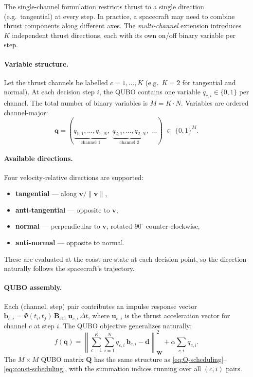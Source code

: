 \documentclass[8pt,a4paper]{article}
\newcommand{\bvec}[1]{\bm{#1}}
\newcommand{\uvec}{\bvec{u}}
\newcommand{\Qmat}{\bvec{Q}}
\theoremstyle{definition}
\theoremstyle{remark}
\begin{document}
The single-channel formulation restricts thrust to a single direction
(e.g.\ tangential) at every step.  In practice, a spacecraft may need
to combine thrust components along different axes.  The
\emph{multi-channel} extension introduces $K$ independent thrust
directions, each with its own on/off binary variable per step.

\paragraph{Variable structure.}
Let the thrust channels be labelled $c = 1, \dots, K$ (e.g.\
$K = 2$ for tangential and normal).  At each decision step $i$, the
QUBO contains one variable $q_{c,i} \in \{0,1\}$ per channel.  The
total number of binary variables is $M = K \cdot N$.  Variables are
ordered channel-major:
\[
  \bvec q = (\underbrace{q_{1,1}, \dots, q_{1,N}}_{\text{channel 1}},\;
             \underbrace{q_{2,1}, \dots, q_{2,N}}_{\text{channel 2}},\;
             \dots)
  \;\in\; \{0,1\}^M.
\]

\paragraph{Available directions.}
Four velocity-relative directions are supported:
\begin{itemize}[leftmargin=1.5em, itemsep=1pt]
  \item \textbf{tangential} --- along $\bvec v / \|\bvec v\|$,
  \item \textbf{anti-tangential} --- opposite to $\bvec v$,
  \item \textbf{normal} --- perpendicular to $\bvec v$, rotated
    $90^\circ$ counter-clockwise,
  \item \textbf{anti-normal} --- opposite to normal.
\end{itemize}
These are evaluated at the coast-arc state at each decision point, so
the direction naturally follows the spacecraft's trajectory.

\paragraph{QUBO assembly.}
Each (channel, step) pair contributes an impulse response vector
$\bvec b_{c,i} = \Phi(t_i, t_f)\, \bvec B_{\mathrm{ctrl}}\,
\uvec_{c,i}\, \Delta t$, where $\uvec_{c,i}$ is the thrust
acceleration vector for channel $c$ at step $i$.  The QUBO objective
generalizes naturally:
\begin{equation}\label{eq:multi-qubo}
  f(\bvec q) = \left\|
    \sum_{c=1}^{K} \sum_{i=1}^{N} q_{c,i}\, \bvec b_{c,i} - \bvec d
  \right\|_{\bvec W}^2
  + \alpha \sum_{c,i} q_{c,i}.
\end{equation}
The $M \times M$ QUBO matrix $\Qmat$ has the same structure as
\eqref{eq:Q-scheduling}--\eqref{eq:const-scheduling}, with the
summation indices running over all $(c, i)$ pairs.
\end{document}
